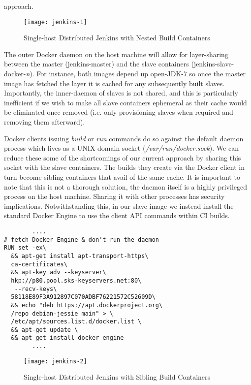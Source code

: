 \documentclass[journal]{IEEEtran}
\begin{document}
approach.
\begin{figure}[htp]
      \centering
      \texttt{[image: jenkins-1]}
      \caption{Single-host Distributed Jenkins with Nested Build Containers} 
      \label{fig:jenkins-1}
\end{figure}
\par
The outer Docker daemon on the host machine will allow
for layer-sharing between the master (jenkins-master) and the slave
containers (jenkins-slave-docker-\textit{n}). For instance,
both images depend up open-JDK-7 so once the master image
has fetched the layer it is cached for any subsequently built slaves.
Importantly, the inner-daemon of slaves is not shared, and this is 
particularly inefficient if we wish to make all slave containers ephemeral as
their cache would be eliminated once removed (i.e. only provisioning slaves when required and removing them afterward). 
\par
Docker clients issuing \textit{build} or \textit{run} commands do so
against the default daemon process which lives as a UNIX domain socket 
(\textit{/var/run/docker.sock}). We can reduce these some of the 
shortcomings of our current approach by sharing this socket with the
slave containers. The builds they create via the Docker client in turn
become sibling containers that avail of the same cache.
It is important to note that this is not a thorough solution,
the daemon itself is a highly privileged process on the host machine.
Sharing it with other processes has security implications.
Notwithstanding this, in our slave image we instead install the standard
Docker Engine to use the client API commands within CI builds.
\begin{verbatim}
  		....
# fetch Docker Engine & don't run the daemon
RUN set -ex\
  && apt-get install apt-transport-https\ 
  ca-certificates\
  && apt-key adv --keyserver\ 
  hkp://p80.pool.sks-keyservers.net:80\
   --recv-keys\
  58118E89F3A912897C070ADBF76221572C52609D\
  && echo "deb https://apt.dockerproject.org\
  /repo debian-jessie main" > \
  /etc/apt/sources.list.d/docker.list \
  && apt-get update \
  && apt-get install docker-engine
		....
\end{verbatim}	
\begin{figure}[htp]
      \centering
      \texttt{[image: jenkins-2]}
      \caption{Single-host Distributed Jenkins with Sibling Build Containers} 
      \label{fig:jenkins-2}
\end{figure}
\end{document}
